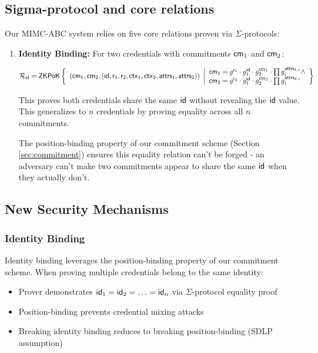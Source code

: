 \subsection{Sigma-protocol and core relations}

Our MIMC-ABC system relies on five core relations proven via $\Sigma$-protocols:
\begin{enumerate}
  

    \item \textbf{Identity Binding:} For two credentials with commitments $\mathsf{cm}_1$ and $\mathsf{cm}_2$:

    \[
    {\mathcal{R}_{\mathsf{id}}} = {\mathsf{ZKPoK}} \left\{ 
    \begin{array}{l} 
    (\mathsf{cm}_1, \mathsf{cm}_2, (\mathsf{id}, \mathsf{r}_1, \mathsf{r}_2, \mathsf{ctx}_1, \mathsf{ctx}_2, \mathsf{attrs}_1, \mathsf{attrs}_2)) \\
    \end{array} 
    \middle|
    \begin{array}{l}
    \mathsf{cm}_1 = g^{\mathsf{r}_1} \cdot g_1^{\mathsf{id}} \cdot g_2^{\mathsf{ctx}_1} \cdot \prod g_i^{\mathsf{attrs}_{1,i}} \wedge \\
     \mathsf{cm}_2 = g^{\mathsf{r}_2} \cdot g_1^{\mathsf{id}} \cdot g_2^{\mathsf{ctx}_2} \cdot \prod g_i^{\mathsf{attrs}_{2,i}} \\
    \end{array} 
    \right\}
    \]
    
    This proves both credentials share the same $\mathsf{id}$ without revealing the $\mathsf{id}$ value. This generalizes to $n$ credentials by proving equality across all $n$ commitments.
    
    The position-binding property of our commitment scheme (Section \ref{sec:commitment}) ensures this equality relation can't be forged - an adversary can't make two commitments appear to share the same $\mathsf{id}$ when they actually don't.
    
\end{enumerate}


\subsection{New Security Mechanisms}

\subsubsection{Identity Binding}
Identity binding leverages the position-binding property of our commitment scheme. When proving multiple credentials belong to the same identity:
\begin{itemize}
    \item Prover demonstrates $\mathsf{id}_1 = \mathsf{id}_2 = \ldots = \mathsf{id}_n$ via $\Sigma$-protocol equality proof
    \item Position-binding prevents credential mixing attacks
    \item Breaking identity binding reduces to breaking position-binding (SDLP assumption)
\end{itemize}



